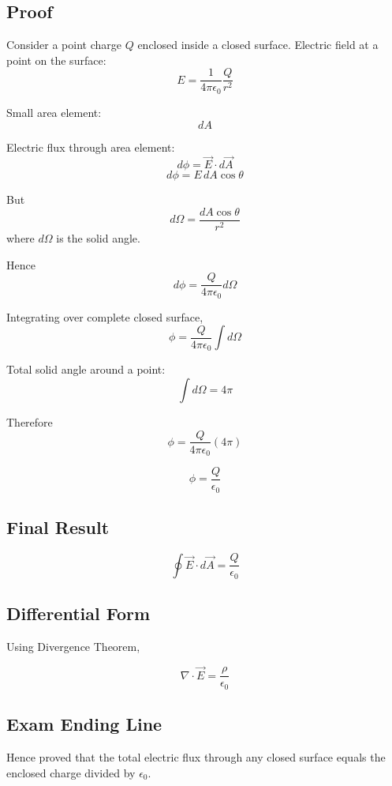 \documentclass[11pt,a4paper]{article}
\begin{document}
\subsection*{Proof}
Consider a point charge \( Q \) enclosed inside a closed surface.
Electric field at a point on the surface:
\[ E = \frac{1}{4\pi\epsilon_0} \frac{Q}{r^2} \]

Small area element:
\[ dA \]

Electric flux through area element:
\[ d\phi = \vec{E} \cdot d\vec{A} \]
\[ d\phi = E \, dA \cos\theta \]

But
\[ d\Omega = \frac{dA \cos\theta}{r^2} \]
where \( d\Omega \) is the solid angle.

Hence
\[ d\phi = \frac{Q}{4\pi\epsilon_0} d\Omega \]

Integrating over complete closed surface,
\[ \phi = \frac{Q}{4\pi\epsilon_0} \int d\Omega \]

Total solid angle around a point:
\[ \int d\Omega = 4\pi \]

Therefore
\[ \phi = \frac{Q}{4\pi\epsilon_0} (4\pi) \]

\begin{tcolorbox}[colback=RoyalBlue!5!white, colframe=RoyalBlue]
    \[ \phi = \frac{Q}{\epsilon_0} \]
\end{tcolorbox}

\subsection*{Final Result}
\begin{tcolorbox}[colback=RoyalBlue!5!white, colframe=RoyalBlue]
    \[ \oint \vec{E} \cdot d\vec{A} = \frac{Q}{\epsilon_0} \]
\end{tcolorbox}

\subsection*{Differential Form}
Using Divergence Theorem,
\begin{tcolorbox}[colback=RoyalBlue!5!white, colframe=RoyalBlue]
    \[ \nabla \cdot \vec{E} = \frac{\rho}{\epsilon_0} \]
\end{tcolorbox}

\subsection*{Exam Ending Line}
Hence proved that the total electric flux through any closed surface equals the enclosed charge divided by \( \epsilon_0 \).
\end{document}
